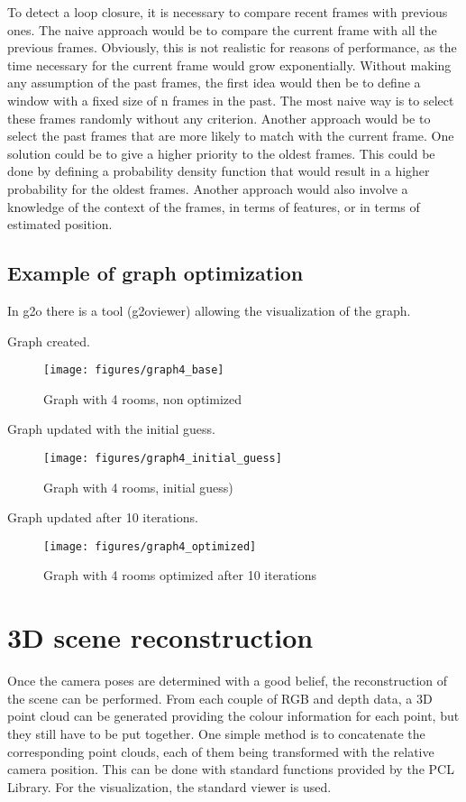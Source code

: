 To detect a loop closure, it is necessary to compare recent frames with previous ones. The naive approach would be to compare the current frame with all the previous frames. Obviously, this is not realistic for reasons of performance, as the time necessary for the current frame would grow exponentially.
Without making any assumption of the past frames, the first idea would then be to define a window with a fixed size of n frames in the past. The most naive way is to select these frames randomly without any criterion. Another approach would be to select the past frames that are more likely to match with the current frame. One solution could be to give a higher priority to the oldest frames. This could be done by defining a probability density function that would result in a higher probability for the oldest frames. Another approach would also involve a knowledge of the context of the frames, in terms of features, or in terms of estimated position.

\subsection{Example of graph optimization}
In g2o there is a tool (g2oviewer) allowing the visualization of the graph.

Graph created.
\begin{figure}[h]
\centering
\texttt{[image: figures/graph4\_base]}
\caption{Graph with 4 rooms, non optimized}
\end{figure}

Graph updated with the initial guess.
\begin{figure}[h]
\centering
\texttt{[image: figures/graph4\_initial\_guess]}
\caption{Graph with 4 rooms, initial guess)}
\end{figure}

Graph updated after 10 iterations.
\begin{figure}[h]
\centering
\texttt{[image: figures/graph4\_optimized]}
\caption{Graph with 4 rooms optimized after 10 iterations}
\end{figure}

\clearpage

\section{3D scene reconstruction}

Once the camera poses are determined with a good belief, the reconstruction of the scene can be performed. From each couple of RGB and depth data, a 3D point cloud can be generated providing the colour information for each point, but they still have to be put together. One simple method is to concatenate the corresponding point clouds, each of them being transformed with the relative camera position. This can be done with standard functions provided by the PCL Library. For the visualization, the standard viewer is used.

